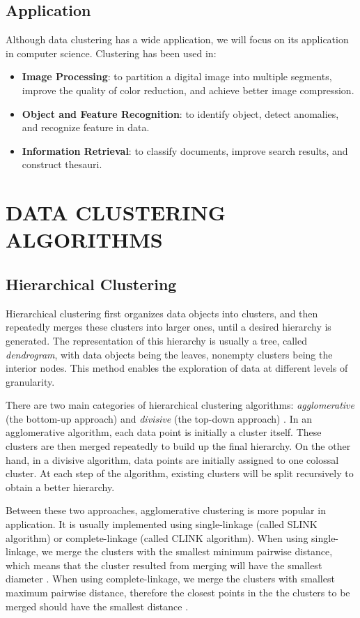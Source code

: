\documentclass[conference]{IEEEtran}
\begin{document}
\subsection{Application}
Although data clustering has a wide application, we will focus on its application in computer science. Clustering has been used in:
\begin{itemize}
\item \textbf{Image Processing}: to partition a digital image into multiple segments, improve the quality of color reduction, and achieve better image compression.
\item \textbf{Object and Feature Recognition}: to identify object, detect anomalies, and recognize feature in data.
\item \textbf{Information Retrieval}: to classify documents, improve search results, and construct thesauri.
\end{itemize}

\section{DATA CLUSTERING ALGORITHMS}
\subsection{Hierarchical Clustering}
Hierarchical clustering first organizes data objects into clusters, and then repeatedly merges these clusters into larger ones, until a desired hierarchy is generated. The representation of this hierarchy is usually a tree, called \textit{dendrogram}, with data objects being the leaves, nonempty clusters being the interior nodes. This method enables the exploration of data at different levels of granularity.

There are two main categories of hierarchical clustering algorithms: \textit{agglomerative} (the bottom-up approach) and \textit{divisive} (the top-down approach) . In an agglomerative algorithm, each data point is initially a cluster itself. These clusters are then merged repeatedly to build up the final hierarchy. On the other hand, in a divisive algorithm, data points are initially assigned to one colossal cluster. At each step of the algorithm, existing clusters will be split recursively to obtain a better hierarchy.

Between these two approaches, agglomerative clustering is more popular in application. It is usually implemented using single-linkage (called SLINK algorithm) or complete-linkage (called CLINK algorithm). When using single-linkage, we merge the clusters with the smallest minimum pairwise distance, which means that the cluster resulted from merging will have the smallest diameter \cite{defays1977efficient}. When using complete-linkage, we merge the clusters with smallest maximum pairwise distance, therefore the closest points in the the clusters to be merged should have the smallest distance \cite{sibson1973slink}. 
\end{document}
